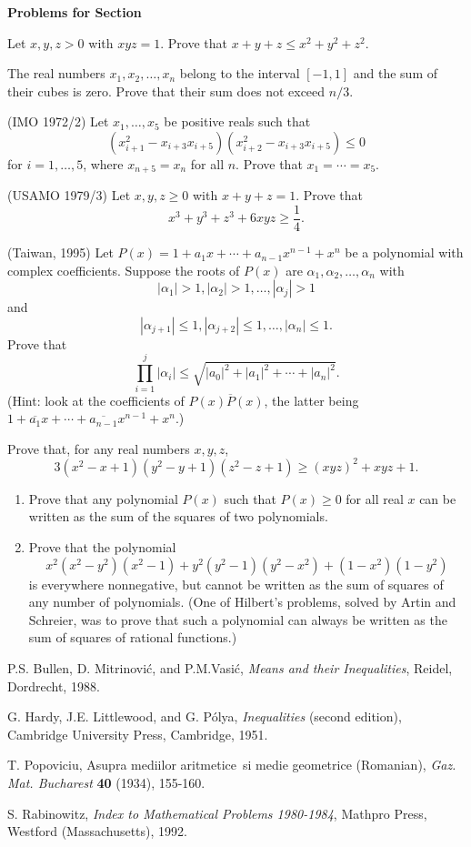 \documentclass[12pt]{report}
\def\alf{\alpha}
\def\be{\begin{enumerate}}
\def\ee{\end{enumerate}}
\def\ii{\item}
\newcounter{exc}
\numberwithin{exc}{section}
\newenvironment{exer}{\vspace{0.1in}
\noindent \textbf{Problems for Section~\thesection} \vspace{0.1in}
\begin{list}{\arabic{exc}.}{\usecounter{exc}}}{\end{list}}
\begin{document}
\begin{exer}
\ii Let $x,y,z>0$ with $xyz=1$.  Prove that $x+y+z\leq x^2+y^2+z^2$.
\ii The real numbers $x_1,x_2,\ldots, x_n$ belong to the interval
$[-1,1]$ and the sum of their cubes is zero.  Prove that their sum does
not exceed $n/3$.
\ii (IMO 1972/2)
Let $x_{1}, \dots, x_{5}$ be positive reals such that
\[
(x_{i+1}^{2}-x_{i+3}x_{i+5})(x_{i+2}^{2}-x_{i+3}x_{i+5}) \leq 0
\]
for $i=1,\dots, 5$, where $x_{n+5}=x_{n}$ for all $n$. Prove that 
$x_{1} = \cdots = x_{5}$.
\ii (USAMO 1979/3) Let $x,y,z\geq 0$ with $x+y+z=1$.  Prove that
\[
x^3+y^3+z^3+6xyz\geq \frac 14.
\]
\ii (Taiwan, 1995)
Let $P(x) = 1+a_1x+ \cdots + a_{n-1}x^{n-1}+x^n$ be a
polynomial with complex coefficients.  Suppose the roots of $P(x)$
are $\alf_1,\alf_2, \ldots,\alf_n$ with
\[|\alf_1|>1, |\alf_2|>1, \ldots,|\alf_j|>1\]
and 
\[|\alf_{j+1}|\leq1, |\alf_{j+2}|\leq1, \ldots,|\alf_n|\leq1.\] 
Prove
that 
\[\prod_{i=1}^j |\alf_i| \leq \sqrt{|a_0|^2+|a_1|^2 + \cdots +
|a_n|^2}.\]
(Hint: look at the coefficients of $P(x) \overline{P}(x)$, the latter 
being $1 + \overline{a_1} x + \cdots + \overline{a_{n-1}}x^{n-1} + 
x^n$.)
\ii Prove that, for any real numbers $x,y,z$,
\[3(x^2-x+1)(y^2-y+1)(z^2-z+1)\geq (xyz)^2+xyz+1.\]
\ii
\be
\ii[(a)]
Prove that any polynomial $P(x)$ such that $P(x) \geq 0$ for all real 
$x$ can be written as the sum of the squares of two polynomials.
\ii[(b)]
Prove that the polynomial
\[
x^2(x^2-y^2)(x^2-1) + y^2(y^2-1)(y^2-x^2) + (1-x^2)(1-y^2)
\]
is everywhere nonnegative, but cannot be written as the sum
of squares of any number of polynomials.
(One of Hilbert's problems, solved by Artin and 
Schreier, was to prove that such a polynomial can always be written 
as the sum of squares of rational functions.)
\ee
\end{exer}

\begin{thebibliography}{99}
P.S. Bullen, D. Mitrinovi\'c, and P.M.Vasi\'c, \textit{Means and their
Inequalities}, Reidel, Dordrecht, 1988.

G. Hardy, J.E. Littlewood, and G. P\'olya, \textit{Inequalities} 
(second edition), Cambridge University Press, Cambridge, 1951.

T. Popoviciu, Asupra mediilor aritmetice \,si medie geometrice
(Romanian), \textit{Gaz. Mat. Bucharest} \textbf{40} (1934), 155-160.

S. Rabinowitz, \textit{Index to Mathematical Problems 1980-1984}, Mathpro 
Press, Westford (Massachusetts), 1992.
\end{thebibliography}
\end{document}
